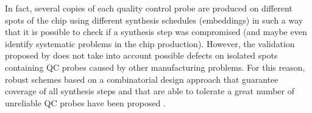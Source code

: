 In fact, several copies of each quality control probe are produced on different
spots of the chip using different synthesis schedules (embeddings) in such a way
that it is possible to check if a synthesis step was compromised
\citep{Hubbell1999a} (and maybe even identify systematic problems in the chip
production). However, the validation proposed by \citet{Hubbell1999a} does not
take into account possible defects on isolated spots containing QC probes caused
by other manufacturing problems. For this reason, robust schemes based on a
combinatorial design approach that guarantee coverage of all synthesis steps and
that are able to tolerate a great number of unreliable QC probes have been
proposed \citep{Alon2001,Sengupta2002,Colbourn2002,Khan2003}.
